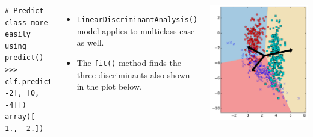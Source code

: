 \documentclass[10pt, aspectratio=169]{beamer} %
\begin{document}
\begin{frame}[fragile,allowframebreaks=0.8]
\begin{columns}[onlytextwidth]
\begin{lstlisting}
# Predict class more easily using predict()
>>> clf.predict([[0, -2], [0, -4]])
array([ 1.,  2.])
\end{lstlisting}
\begin{itemize}
\item \verb+LinearDiscriminantAnalysis()+ model applies to multiclass case as well.
\item The \verb+fit()+ method finds the three discriminants also shown in the plot below.
\end{itemize}
\centerline{\includegraphics[width=0.55\columnwidth]{3Class_LDA_classes.pdf}}
\end{columns}
\end{frame}
\end{document}
